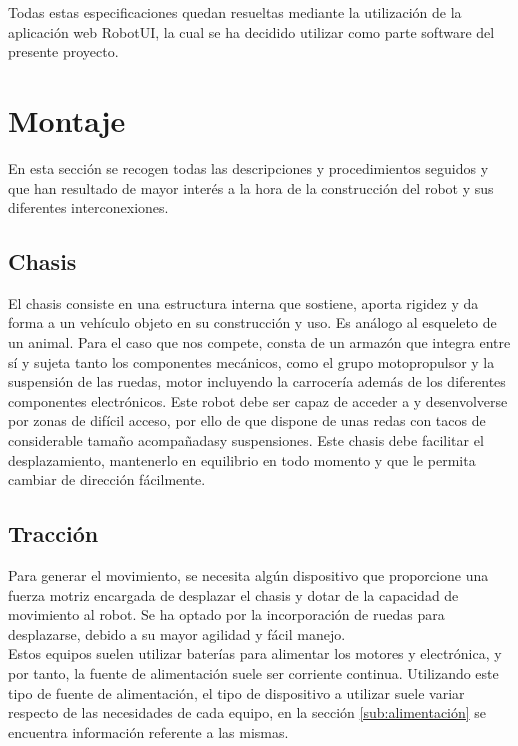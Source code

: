Todas estas especificaciones quedan resueltas mediante la utilización de la aplicación web RobotUI, la cual se ha decidido utilizar como parte software del presente proyecto.\\








\section{Montaje}

En esta sección se recogen todas las descripciones y procedimientos seguidos y que han resultado de mayor interés a la hora de la construcción del robot y 
sus diferentes interconexiones.\\

\subsection{Chasis}

El chasis consiste en una estructura interna que sostiene, aporta rigidez y da forma a un vehículo objeto en su construcción y uso. Es análogo al esqueleto de un animal.
Para el caso que nos compete, consta de un armazón​ que integra entre sí y sujeta tanto los componentes mecánicos, como el grupo motopropulsor y la suspensión de las ruedas,
motor incluyendo la carrocería además de los diferentes componentes electrónicos.​ Este robot debe ser capaz de acceder a y desenvolverse por zonas de difícil acceso, por ello de que dispone de unas redas con tacos de considerable tamaño 
acompañadasy suspensiones. Este chasis debe  facilitar el  desplazamiento, mantenerlo en equilibrio en todo momento y que le permita cambiar de dirección fácilmente.

\subsection{Tracción}

Para generar el movimiento, se necesita algún dispositivo que proporcione una fuerza motriz encargada de desplazar el chasis y dotar de la capacidad de movimiento al robot.
Se ha optado por la incorporación de ruedas para desplazarse, debido a su mayor agilidad y fácil manejo.\\

Estos equipos suelen utilizar baterías para alimentar los motores y electrónica, y por tanto, la fuente de alimentación suele ser corriente continua. Utilizando este tipo de fuente de alimentación, 
el tipo de dispositivo a utilizar suele variar respecto de las necesidades de cada equipo, en la sección \ref{sub:alimentación} se encuentra información referente a las mismas.

